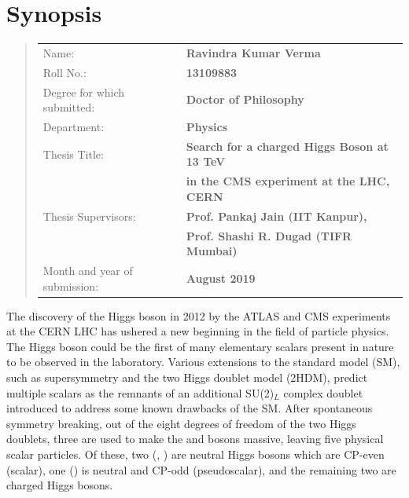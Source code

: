 \chapter{Synopsis}
\bigskip
\begin{quote}
\begin{tabular}[c]{ll}
Name: & {\textbf {Ravindra Kumar Verma}}\\
Roll No.: & {\textbf{ 13109883}}\\
Degree for which submitted: &  {\textbf{ Doctor of Philosophy}}\\
Department: & {\textbf{ Physics}}\\
Thesis Title: & {\textbf{ Search for a charged Higgs Boson at 13 TeV }}\\
 {}& {\textbf{ in the CMS experiment at the LHC, CERN}}\\
Thesis Supervisors: & {\textbf{ Prof. Pankaj Jain (IIT Kanpur),}}\\ 
{}&{\textbf{ Prof. Shashi R. Dugad (TIFR Mumbai)}}\\ 
Month and year of submission: & {\textbf{ August 2019}} 
\end{tabular}
\end{quote}
\hrulefill
\bigskip

The discovery of the Higgs boson in 2012 by the ATLAS and CMS experiments at 
the CERN LHC has ushered a new beginning in the field of particle physics. 
The Higgs boson could be the first of many elementary scalars present in 
nature to be observed in the laboratory. Various extensions to the standard 
model (SM), such as supersymmetry and the two Higgs doublet model (2HDM), 
predict multiple scalars as the remnants of an additional SU(2)$_L$ complex 
doublet introduced to address some known drawbacks of the SM. After spontaneous 
symmetry breaking, out of the eight degrees of freedom of the two Higgs doublets, 
three are used to make the \PW and \PZ bosons massive, leaving five physical scalar
particles. Of these, two (\Ph, \PH) are neutral Higgs bosons which are
CP-even (scalar), one (\PSA) is neutral and CP-odd (pseudoscalar), and the
remaining two are charged Higgs \PHpm bosons.

